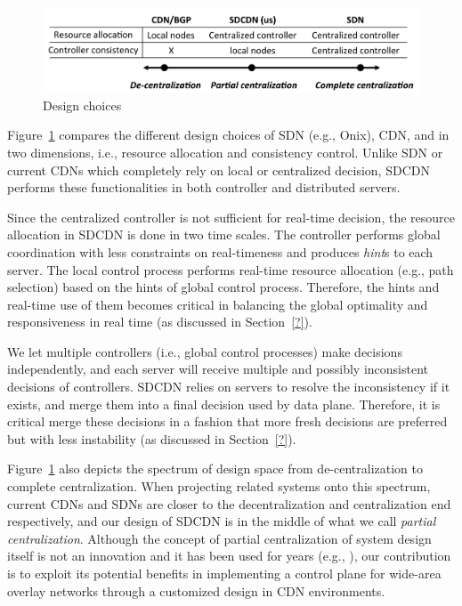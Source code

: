 \begin{figure}[h!]
\centering
\includegraphics[width=1.0\columnwidth]{figures/design-space-3.pdf}
\caption{Design choices}
\label{fig:design-space}
\end{figure}


Figure~\ref{fig:design-space} compares the different design choices of SDN (e.g., Onix), CDN, and \SDCDN in two dimensions, i.e., resource allocation and consistency control. Unlike SDN or current CDNs which completely rely on local or centralized decision, SDCDN performs these functionalities in both controller and distributed servers.

	 Since the centralized controller is not sufficient for real-time decision, the resource allocation in SDCDN is done in two time scales. The controller performs global coordination with less constraints on real-timeness and produces {\it hint}s to each server. The local control process performs real-time resource allocation (e.g., path selection) based on the hints of global control process. Therefore, the hints and real-time use of them becomes critical in balancing the global optimality and responsiveness in real time (as discussed in Section~\ref{?}).

	 We let multiple controllers (i.e., global control processes) make decisions independently, and each server will receive multiple and possibly inconsistent decisions of controllers. SDCDN relies on servers to resolve the inconsistency if it exists, and merge them into a final decision used by data plane. Therefore, it is critical merge these decisions in a fashion that more fresh decisions are preferred but with less instability (as discussed in Section~\ref{?}).

Figure~\ref{fig:design-space} also depicts the spectrum of design space from de-centralization to complete centralization.  When projecting related systems onto this spectrum, current CDNs and SDNs are closer to the decentralization and centralization end respectively, and our design of SDCDN is in the middle of what we call {\it partial centralization}.
Although the concept of partial centralization of system design itself is not an innovation and it has been used for years (e.g., \cite{?}), our contribution is to exploit its potential benefits in implementing a control plane for wide-area overlay networks through a customized design in CDN environments.







